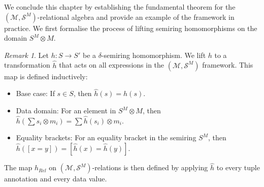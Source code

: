 \documentclass[oneside, 11pt]{amsbook}
\theoremstyle{plain}
\theoremstyle{definition}
\theoremstyle{remark}
\newtheorem*{remark}{Remark}
\begin{document}
We conclude this chapter by establishing the fundamental theorem for the $(\mathcal{M}, \mathcal{S}^M)$-relational algebra and provide an example of the framework in practice. We first formalise the process of lifting semiring homomorphisms on the domain $S^M \otimes M$.

\begin{remark}
    Let $h: S \to S'$ be a $\delta$-semiring homomorphism. We lift $h$ to a transformation $\widehat{h}$ that acts on all expressions in the $(\mathcal{M}, \mathcal{S}^M)$ framework. This map is defined inductively:
    \begin{itemize}
        \item Base case: If $s \in S$, then $\widehat{h}(s) = h(s)$.
        \item Data domain: For an element in $S^M \otimes M$, then $\widehat{h}(\sum s_i \otimes m_i) = \sum \widehat{h}(s_i) \otimes m_i$.
        \item Equality brackets: For an equality bracket in the semiring $S^M$, then $\widehat{h}([x = y]) = [\widehat{h}(x) = \widehat{h}(y)]$.
    \end{itemize}
    The map $h_{Rel}$ on $(\mathcal{M}, \mathcal{S}^M)$-relations is then defined by applying $\widehat{h}$ to every tuple annotation and every data value.
\end{remark}
\end{document}
